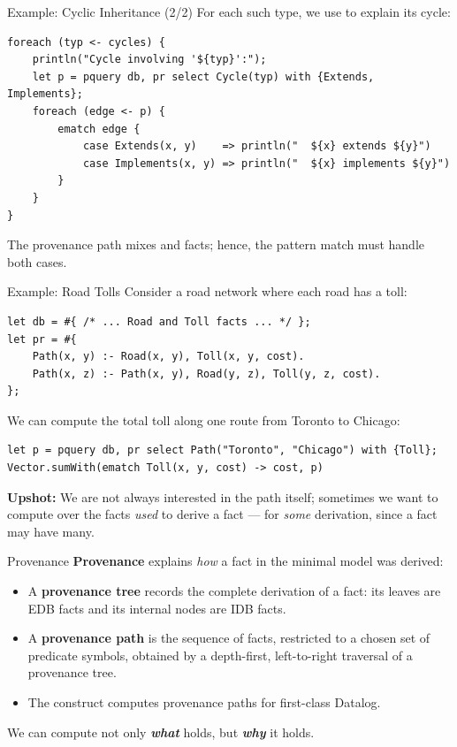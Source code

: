 \begin{frame}[fragile]{Example: Cyclic Inheritance (2/2)}
For each such type, we use  to explain its cycle:

\begin{lstlisting}[language=flix, xleftmargin=0.8cm]
foreach (typ <- cycles) {
    println("Cycle involving '${typ}':");
    let p = pquery db, pr select Cycle(typ) with {Extends, Implements};
    foreach (edge <- p) {
        ematch edge {
            case Extends(x, y)    => println("  ${x} extends ${y}")
            case Implements(x, y) => println("  ${x} implements ${y}")
        }
    }
}
\end{lstlisting}

The provenance path mixes  and  facts; hence, the
pattern match must handle both cases.
\end{frame}

\begin{frame}[fragile]{Example: Road Tolls}
Consider a road network where each road has a toll:

\begin{lstlisting}[language=flix, xleftmargin=0.8cm]
let db = #{ /* ... Road and Toll facts ... */ };
let pr = #{
    Path(x, y) :- Road(x, y), Toll(x, y, cost).
    Path(x, z) :- Path(x, y), Road(y, z), Toll(y, z, cost).
};
\end{lstlisting}

We can compute the total toll along one route from Toronto to Chicago:

\begin{lstlisting}[language=flix, xleftmargin=0.8cm]
let p = pquery db, pr select Path("Toronto", "Chicago") with {Toll};
Vector.sumWith(ematch Toll(x, y, cost) -> cost, p)
\end{lstlisting}

\pause

\textbf{Upshot:} We are not always interested in the path itself; sometimes we
want to compute over the facts \emph{used} to derive a fact --- for \emph{some}
derivation, since a fact may have many.
\end{frame}

\begin{frame}{Provenance}
\textbf{Provenance} explains \emph{how} a fact in the minimal model was derived:

\begin{itemize}
    \item A \textbf{provenance tree} records the complete derivation of a fact:
    its leaves are EDB facts and its internal nodes are IDB facts.
    \item A \textbf{provenance path} is the sequence of facts, restricted to a
    chosen set of predicate symbols, obtained by a depth-first, left-to-right
    traversal of a provenance tree.
    \item The  construct computes provenance paths for first-class
    Datalog.
\end{itemize}

We can compute not only \textbf{\emph{what}} holds, but \textbf{\emph{why}} it
holds.
\end{frame}


